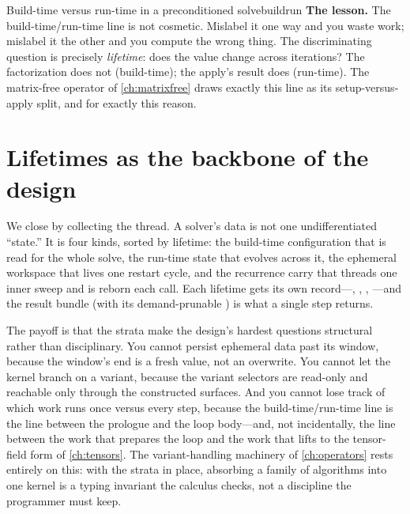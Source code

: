 \begin{workedexample}{Build-time versus run-time in a preconditioned solve}{buildrun}
\textbf{The lesson.} The build-time/run-time line is not cosmetic. Mislabel it
one way and you waste work; mislabel it the other and you compute the wrong
thing. The discriminating question is precisely \emph{lifetime}: does the value
change across iterations? The factorization does not (build-time); the apply's
result does (run-time). The matrix-free operator of \cref{ch:matrixfree} draws
exactly this line as its setup-versus-apply split, and for exactly this reason.
\end{workedexample}

\section{Lifetimes as the backbone of the design}

We close by collecting the thread. A solver's data is not one undifferentiated
``state.'' It is four kinds, sorted by lifetime: the build-time configuration
that is read for the whole solve, the run-time state that evolves across it, the
ephemeral workspace that lives one restart cycle, and the recurrence carry that
threads one inner sweep and is reborn each call. Each lifetime gets its own
record---, , , ---and
the result bundle  (with its demand-prunable )
is what a single step returns.

The payoff is that the strata make the design's hardest questions structural
rather than disciplinary. You cannot persist ephemeral data past its window,
because the window's end is a fresh value, not an overwrite. You cannot let the
kernel branch on a variant, because the variant selectors are read-only and
reachable only through the constructed surfaces. And you cannot lose track of
which work runs once versus every step, because the build-time/run-time line is
the line between the  prologue and the loop body---and, not
incidentally, the line between the work that prepares the loop and the work that
lifts to the tensor-field form of \cref{ch:tensors}. The variant-handling
machinery of \cref{ch:operators} rests entirely on this: with the strata in
place, absorbing a family of algorithms into one kernel is a typing invariant the
calculus checks, not a discipline the programmer must keep.

